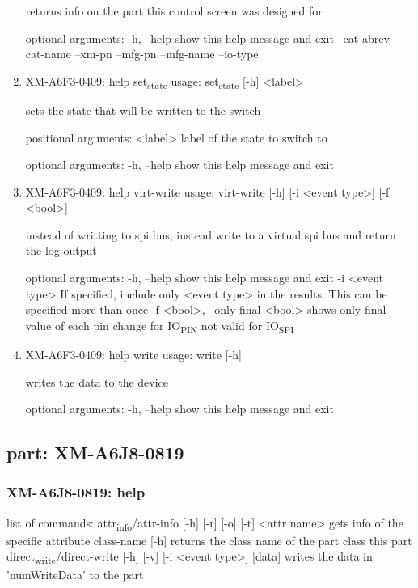\documentclass[11pt]{article}
\begin{document}
\begin{enumerate}
returns info on the part this control screen was designed for

optional arguments:
  -h, --help   show this help message and exit
  --cat-abrev
  --cat-name
  --xm-pn
  --mfg-pn
  --mfg-name
  --io-type

\item XM-A6F3-0409: help set\textsubscript{state}
\label{sec:org94d5c37}
usage: set\textsubscript{state} [-h] <label>

sets the state that will be written to the switch

positional arguments:
  <label>     label of the state to switch to

optional arguments:
  -h, --help  show this help message and exit

\item XM-A6F3-0409: help virt-write
\label{sec:org7396d60}
usage: virt-write [-h] [-i <event type>] [-f <bool>]

instead of writting to spi bus, instead write to a virtual spi bus and return
the log output

optional arguments:
  -h, --help            show this help message and exit
  -i <event type>       If specified, include only <event type> in the
                        results. This can be specified more than once
  -f <bool>, --only-final <bool>
                        shows only final value of each pin change for IO\textsubscript{PIN}
                        not valid for IO\textsubscript{SPI}

\item XM-A6F3-0409: help write
\label{sec:orge003b54}
usage: write [-h]

writes the data to the device

optional arguments:
  -h, --help  show this help message and exit
\end{enumerate}

\subsection{part: XM-A6J8-0819}
\label{sec:orgf3725f0}
\subsubsection{XM-A6J8-0819: help}
\label{sec:org364018d}
list of commands:
  attr\textsubscript{info}/attr-info [-h] [-r] [-o] [-t] <attr name>
    gets info of the specific attribute
  class-name [-h]
    returns the class name of the part class this part
  direct\textsubscript{write}/direct-write [-h] [-v] [-i <event type>] [data]
    writes the data in 'numWriteData' to the part
\end{document}
